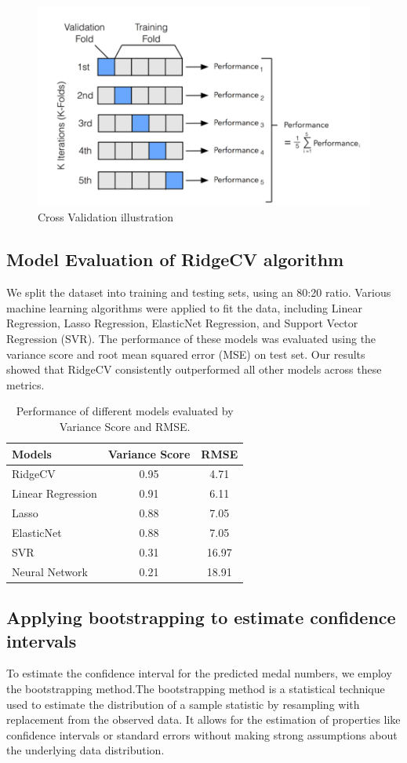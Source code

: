 \documentclass[12pt]{article}  %
\begin{document}
\begin{figure}[H]
    \centering
    \includegraphics[width=0.5\linewidth]{crossValidation.png}
    \caption{Cross Validation illustration}
    \label{fig:enter-label}
\end{figure}
\subsection{Model Evaluation of RidgeCV algorithm}
We split the dataset into training and testing sets, using an 80:20 ratio. Various machine learning algorithms were applied to fit the data, including Linear Regression, Lasso Regression, ElasticNet Regression, and Support Vector Regression (SVR). The performance of these models was evaluated using the variance score and root mean squared error (MSE) on test set. Our results showed that RidgeCV consistently outperformed all other models across these metrics.

\begin{table}[H]
\centering
\begin{tabular}{lcc}
\toprule
\textbf{Models} & \textbf{Variance Score} & \textbf{RMSE} \\
\midrule
RidgeCV         & 0.95                    & 4.71         \\
Linear Regression & 0.91                  & 6.11         \\
Lasso           & 0.88                    & 7.05         \\
ElasticNet      & 0.88                    & 7.05         \\
SVR             & 0.31                    & 16.97        \\
Neural Network  & 0.21                    & 18.91        \\
\bottomrule
\end{tabular}
\caption{Performance of different models evaluated by Variance Score and RMSE.}
\label{tab:model_performance}
\end{table}
\subsection{Applying bootstrapping to estimate confidence intervals}
To estimate the confidence interval for the predicted medal numbers, we employ the bootstrapping method.The bootstrapping method is a statistical technique used to estimate the distribution of a sample statistic by resampling with replacement from the observed data. It allows for the estimation of properties like confidence intervals or standard errors without making strong assumptions about the underlying data distribution.
\end{document}
